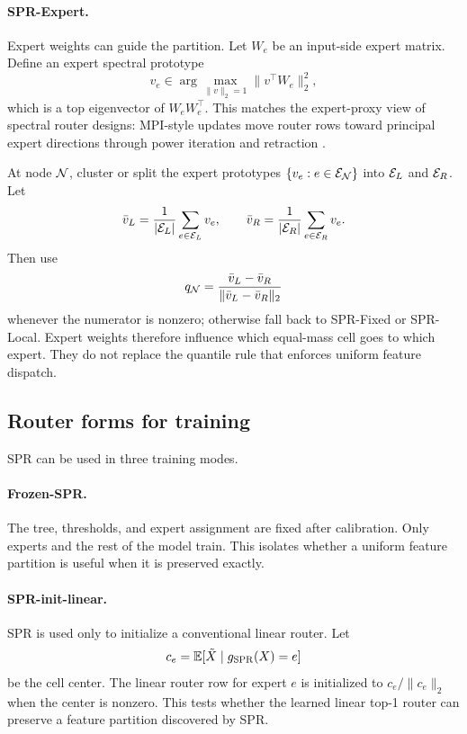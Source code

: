\documentclass{article}
\begin{document}
\paragraph{SPR-Expert.}
Expert weights can guide the partition.  Let $W_e$ be an input-side expert
matrix.  Define an expert spectral prototype
\begin{equation}
 v_e\in\arg\max_{\|v\|_2=1}\|v^{\top}W_e\|_2^2,
\end{equation}
which is a top eigenvector of $W_eW_e^{\top}$.  This matches the expert-proxy
view of spectral router designs: MPI-style updates move router rows toward
principal expert directions through power iteration and retraction
\citep{routermpi2026}.

At node $\mathcal{N}$, cluster or split the expert prototypes
$\{v_e:e\in\mathcal{E}_{\mathcal{N}}\}$ into $\mathcal{E}_L$ and $\mathcal{E}_R$.  Let
\begin{equation}
 \bar v_L=\frac{1}{|\mathcal{E}_L|}\sum_{e\in\mathcal{E}_L} v_e,\qquad
 \bar v_R=\frac{1}{|\mathcal{E}_R|}\sum_{e\in\mathcal{E}_R} v_e.
\end{equation}
Then use
\begin{equation}
 q_{\mathcal{N}}=\frac{\bar v_L-\bar v_R}{\|\bar v_L-\bar v_R\|_2}
\end{equation}
whenever the numerator is nonzero; otherwise fall back to SPR-Fixed or
SPR-Local.  Expert weights therefore influence which equal-mass cell goes to
which expert.  They do not replace the quantile rule that enforces uniform
feature dispatch.

\subsection{Router forms for training}

SPR can be used in three training modes.

\paragraph{Frozen-SPR.}
The tree, thresholds, and expert assignment are fixed after calibration.  Only
experts and the rest of the model train.  This isolates whether a uniform feature
partition is useful when it is preserved exactly.

\paragraph{SPR-init-linear.}
SPR is used only to initialize a conventional linear router.  Let
\begin{equation}
 c_e=\mathbb{E}[\tilde X\mid g_{\mathrm{SPR}}(X)=e]
\end{equation}
be the cell center.  The linear router row for expert $e$ is initialized to
$c_e/\|c_e\|_2$ when the center is nonzero.  This tests whether the learned
linear top-1 router can preserve a feature partition discovered by SPR.
\end{document}

